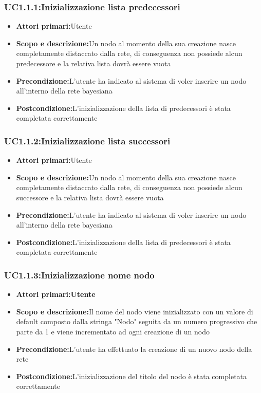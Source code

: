 \subsubsection{UC1.1.1:Inizializzazione lista predecessori}
\begin{itemize}
	\item{\textbf{Attori primari:}Utente}
	\item{\textbf{Scopo e descrizione:}Un nodo al momento della sua creazione nasce completamente distaccato dalla rete, di conseguenza non possiede alcun predecessore e la relativa lista dovrà essere vuota}
	\item{\textbf{Precondizione:}L'utente ha indicato al sistema di voler inserire un nodo all'interno della rete bayesiana}
	\item{\textbf{Postcondizione:}L'inizializzazione della lista di predecessori è stata completata correttamente}
\end{itemize}
\subsubsection{UC1.1.2:Inizializzazione lista successori}
\begin{itemize}
	\item{\textbf{Attori primari:}Utente}
	\item{\textbf{Scopo e descrizione:}Un nodo al momento della sua creazione nasce completamente distaccato dalla rete, di conseguenza non possiede alcun successore e la relativa lista dovrà essere vuota}
	\item{\textbf{Precondizione:}L'utente ha indicato al sistema di voler inserire un nodo all'interno della rete bayesiana}
	\item{\textbf{Postcondizione:}L'inizializzazione della lista di predecessori è stata completata correttamente}
\end{itemize}
\subsubsection{UC1.1.3:Inizializzazione nome nodo}
\begin{itemize}
	\item{\textbf{Attori primari:Utente}}
	\item{\textbf{Scopo e descrizione:}Il nome del nodo viene inizializzato con un valore di default composto dalla stringa "Nodo" seguita da un numero progressivo che parte da 1 e viene incrementato ad ogni creazione di un nodo}
	\item{\textbf{Precondizione:}L'utente ha effettuato la creazione di un nuovo nodo della rete}
	\item{\textbf{Postcondizione:}L'inizializzazione del titolo del nodo è stata completata correttamente}
\end{itemize}

